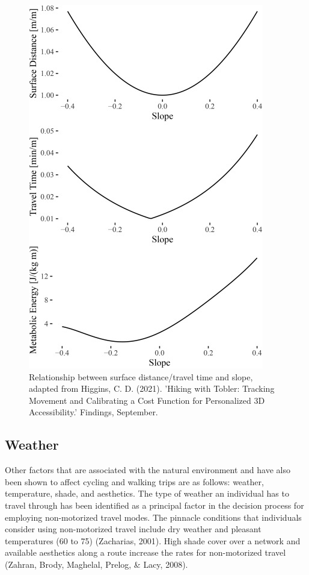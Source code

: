 \documentclass[
11pt, %
oneside, %
english, %
singlespacing, %
]{macthesis} %
\begin{document}
\begin{figure}

{\centering \includegraphics[width=0.9\linewidth]{figure/ch02-Fig-03} 

}

\caption{Relationship between surface distance/travel time and slope, adapted from Higgins, C. D. (2021). 'Hiking with Tobler: Tracking Movement and Calibrating a Cost Function for Personalized 3D Accessibility.' Findings, September.}\label{fig:surface-distance}
\end{figure}

\newpage

\hypertarget{weather}{%
\subsection{Weather}\label{weather}}

Other factors that are associated with the natural environment and have also been shown to affect cycling and walking trips are as follows: weather, temperature, shade, and aesthetics. The type of weather an individual has to travel through has been identified as a principal factor in the decision process for employing non-motorized travel modes. The pinnacle conditions that individuals consider using non-motorized travel include dry weather and pleasant temperatures (60 to 75) (Zacharias, 2001). High shade cover over a network and available aesthetics along a route increase the rates for non-motorized travel (Zahran, Brody, Maghelal, Prelog, \& Lacy, 2008).
\end{document}
